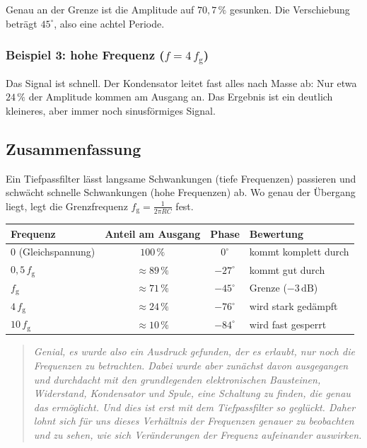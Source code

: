 \documentclass[a4paper,12pt,twoside]{report}
\theoremstyle{definition}
\begin{document}
Genau an der Grenze ist die Amplitude auf $70{,}7\,\%$ gesunken. Die
Verschiebung beträgt $45^\circ$, also eine achtel Periode.

\subsubsection*{Beispiel 3: hohe Frequenz ($f = 4\,f_\mathrm{g}$)}

\begin{center}
\end{center}

Das Signal ist schnell. Der Kondensator leitet fast alles nach Masse ab:
Nur etwa $24\,\%$ der Amplitude kommen am Ausgang an. Das Ergebnis
ist ein deutlich kleineres, aber immer noch sinusförmiges Signal.

\subsection*{Zusammenfassung}

Ein Tiefpassfilter lässt langsame Schwankungen (tiefe Frequenzen) passieren und schwächt schnelle Schwankungen (hohe
Frequenzen) ab. Wo genau der Übergang liegt, legt die Grenzfrequenz $f_\mathrm{g} = \frac{1}{2\pi RC}$ fest.

\begin{center}
\renewcommand{\arraystretch}{1.3}
\begin{tabular}{|l|c|c|l|}
  \hline
  \textbf{Frequenz} & \textbf{Anteil am Ausgang} & \textbf{Phase} & \textbf{Bewertung} \\
  \hline
  $0$ (Gleichspannung)      & $100\,\%$   & $0^\circ$   & kommt komplett durch \\
  $0{,}5\,f_\mathrm{g}$     & $\approx 89\,\%$ & $-27^\circ$ & kommt gut durch \\
  $f_\mathrm{g}$            & $\approx 71\,\%$ & $-45^\circ$ & Grenze ($-3\,\mathrm{dB}$) \\
  $4\,f_\mathrm{g}$         & $\approx 24\,\%$ & $-76^\circ$ & wird stark gedämpft \\
  $10\,f_\mathrm{g}$        & $\approx 10\,\%$ & $-84^\circ$ & wird fast gesperrt \\
  \hline
\end{tabular}
\end{center}

\begin{quote}
\textit{Genial, es wurde also ein Ausdruck gefunden, der es erlaubt, nur noch die Frequenzen zu betrachten. Dabei wurde aber zunächst davon ausgegangen und durchdacht mit den grundlegenden elektronischen Bausteinen, Widerstand, Kondensator und Spule, eine Schaltung zu finden, die genau das ermöglicht. Und dies ist erst mit dem Tiefpassfilter so geglückt. Daher lohnt sich für uns dieses Verhältnis der Frequenzen genauer zu beobachten und zu sehen, wie sich Veränderungen der Frequenz aufeinander auswirken.}
\end{quote}
\end{document}
